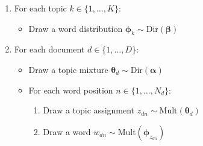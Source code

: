 \begin{enumerate}
    \item For each topic $k \in \{1, \ldots, K\}$:
    \begin{itemize}
        \item Draw a word distribution $\bm{\phi}_k \sim \text{Dir}(\bm{\beta})$
    \end{itemize}
    \item For each document $d \in \{1, \ldots, D\}$:
    \begin{itemize}
        \item Draw a topic mixture $\bm{\theta}_d \sim \text{Dir}(\bm{\alpha})$
        \item For each word position $n \in \{1, \ldots, N_d\}$:
        \begin{enumerate}
            \item Draw a topic assignment $z_{dn} \sim \text{Mult}(\bm{\theta}_d)$
            \item Draw a word $w_{dn} \sim \text{Mult}(\bm{\phi}_{z_{dn}})$
        \end{enumerate}
    \end{itemize}
\end{enumerate}

